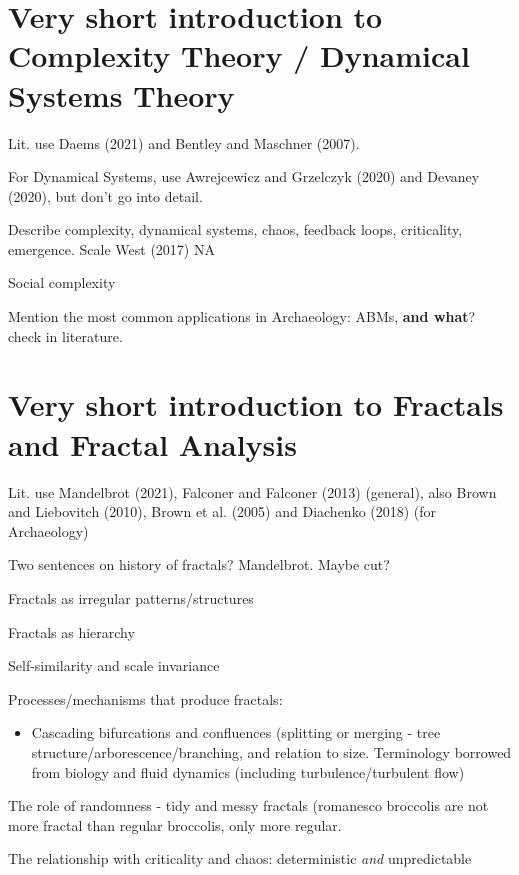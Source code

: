 \documentclass[
  12pt,
]{book}
\providecommand{\tightlist}{%
  \setlength{\itemsep}{0pt}\setlength{\parskip}{0pt}}
\begin{document}
\hypertarget{very-short-introduction-to-complexity-theory-dynamical-systems-theory}{%
\section{Very short introduction to Complexity Theory / Dynamical Systems Theory}\label{very-short-introduction-to-complexity-theory-dynamical-systems-theory}}

Lit. use Daems (2021) and Bentley and Maschner (2007).

For Dynamical Systems, use Awrejcewicz and Grzelczyk (2020) and Devaney (2020), but don't go into detail.

Describe complexity, dynamical systems, chaos, feedback loops, criticality, emergence. Scale West (2017) NA

Social complexity

Mention the most common applications in Archaeology: ABMs, \textbf{and what}? check in literature.

\hypertarget{fractals}{%
\section{Very short introduction to Fractals and Fractal Analysis}\label{fractals}}

Lit. use Mandelbrot (2021), Falconer and Falconer (2013) (general), also Brown and Liebovitch (2010), Brown et al. (2005) and Diachenko (2018) (for Archaeology)

Two sentences on history of fractals? Mandelbrot. Maybe cut?

Fractals as irregular patterns/structures

Fractals as hierarchy

Self-similarity and scale invariance

Processes/mechanisms that produce fractals:

\begin{itemize}
\tightlist
\item
  Cascading bifurcations and confluences (splitting or merging - tree structure/arborescence/branching, and relation to size. Terminology borrowed from biology and fluid dynamics (including turbulence/turbulent flow)
\end{itemize}

The role of randomness - tidy and messy fractals (romanesco broccolis are not more fractal than regular broccolis, only more regular.

The relationship with criticality and chaos: deterministic \emph{and} unpredictable
\end{document}
